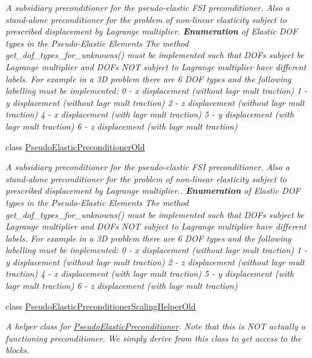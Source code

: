 \begin{DoxyCompactItemize}
\begin{DoxyCompactList}\small\item\em A subsidiary preconditioner for the pseudo-\/elastic F\+SI preconditioner. Also a stand-\/alone preconditioner for the problem of non-\/linear elasticity subject to prescribed displacement by Lagrange multiplier. {\bfseries Enumeration} of Elastic D\+OF types in the Pseudo-\/\+Elastic Elements The method get\+\_\+dof\+\_\+types\+\_\+for\+\_\+unknowns() must be implemented such that D\+O\+Fs subject be Lagrange multiplier and D\+O\+Fs N\+OT subject to Lagrange multiplier have different labels. For example in a 3D problem there are 6 D\+OF types and the following labelling must be implemented\+: 0 -\/ x displacement (without lagr mult traction) 1 -\/ y displacement (without lagr mult traction) 2 -\/ z displacement (without lagr mult traction) 4 -\/ x displacement (with lagr mult traction) 5 -\/ y displacement (with lagr mult traction) 6 -\/ z displacement (with lagr mult traction) \end{DoxyCompactList}\item 
class \hyperlink{classoomph_1_1PseudoElasticPreconditionerOld}{Pseudo\+Elastic\+Preconditioner\+Old}
\begin{DoxyCompactList}\small\item\em A subsidiary preconditioner for the pseudo-\/elastic F\+SI preconditioner. Also a stand-\/alone preconditioner for the problem of non-\/linear elasticity subject to prescribed displacement by Lagrange multiplier.. {\bfseries Enumeration} of Elastic D\+OF types in the Pseudo-\/\+Elastic Elements The method get\+\_\+dof\+\_\+types\+\_\+for\+\_\+unknowns() must be implemented such that D\+O\+Fs subject be Lagrange multiplier and D\+O\+Fs N\+OT subject to Lagrange multiplier have different labels. For example in a 3D problem there are 6 D\+OF types and the following labelling must be implemented\+: 0 -\/ x displacement (without lagr mult traction) 1 -\/ y displacement (without lagr mult traction) 2 -\/ z displacement (without lagr mult traction) 4 -\/ x displacement (with lagr mult traction) 5 -\/ y displacement (with lagr mult traction) 6 -\/ z displacement (with lagr mult traction) \end{DoxyCompactList}\item 
class \hyperlink{classoomph_1_1PseudoElasticPreconditionerScalingHelperOld}{Pseudo\+Elastic\+Preconditioner\+Scaling\+Helper\+Old}
\begin{DoxyCompactList}\small\item\em A helper class for \hyperlink{classoomph_1_1PseudoElasticPreconditioner}{Pseudo\+Elastic\+Preconditioner}. Note that this is N\+OT actually a functioning preconditioner. We simply derive from this class to get access to the blocks. \end{DoxyCompactList}\item 

\end{DoxyCompactItemize}
